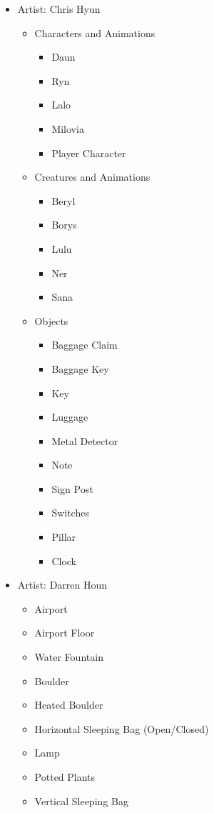 \documentclass[a4paper]{article}
\begin{document}
\begin{itemize}
\item Artist: Chris Hyun
\begin{itemize}
\item Characters and Animations
\begin{itemize}
\item Daun
\item Ryn
\item Lalo
\item Milovia
\item Player Character
\end{itemize}
\end{itemize}
\begin{itemize}
\item Creatures and Animations
\begin{itemize}
\item Beryl
\item Borys
\item Lulu
\item Ner
\item Sana
\end{itemize}
\end{itemize}
\begin{itemize}
\item Objects
\begin{itemize}
\item Baggage Claim
\item Baggage Key
\item Key
\item Luggage
\item Metal Detector
\item Note
\item Sign Post
\item Switches
\item Pillar
\item Clock
\end{itemize}
\end{itemize}

\item Artist: Darren Houn
\begin{itemize}
\item Airport 
\item Airport Floor
\item Water Fountain
\item Boulder
\item Heated Boulder
\item Horizontal Sleeping Bag (Open/Closed)
\item Lamp
\item Potted Plants
\item Vertical Sleeping Bag
\end{itemize}

\end{itemize}
\end{document}
